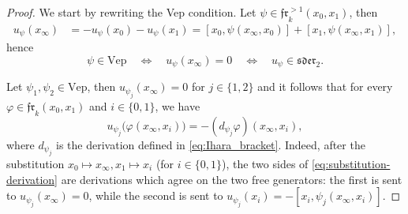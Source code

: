 \documentclass[a4paper,fleqn]{cas-sc}
\begin{document}
\begin{proof}
We start by rewriting the Vep condition. Let 
\(\psi\in\mathfrak{fr}^{>1}_k(x_0,x_1)\), then
\begin{align*}
u_\psi(x_\infty)
&=
-u_\psi(x_0)-u_\psi(x_1)=
[x_0,\psi(x_\infty,x_0)]
+[x_1,\psi(x_\infty,x_1)],
\end{align*}
hence
\[
\psi\in\mathrm{Vep}
\quad\Longleftrightarrow\quad
u_\psi(x_\infty)=0
\quad\Longleftrightarrow\quad
u_\psi\in\mathfrak{sder}_2.
\]

Let \(\psi_1,\psi_2\in \mathrm{Vep}\), then \(u_{\psi_j}(x_\infty)=0\)
for $j \in \{1,2\}$ and it follows that for 
every
\(\varphi\in\mathfrak{fr}_k(x_0,x_1)\) and
\(i\in\{0,1\}\), we have
\begin{equation}\label{eq:substitution-derivation}
u_{\psi_j}\bigl(\varphi(x_\infty,x_i)\bigr)
=
-(d_{\psi_j}\varphi)(x_\infty,x_i),
\end{equation}
where $d_{\psi_j}$ is the derivation defined in \eqref{eq:Ihara_bracket}.
Indeed, after the substitution $x_0 \mapsto x_\infty, x_1 \mapsto x_i$ (for $i\in \{0,1\}$), the two sides of
\eqref{eq:substitution-derivation} are derivations which agree on the two free
generators: the first is sent to
\(u_{\psi_j}(x_\infty)=0\), while the second is sent to
$u_{\psi_j}(x_i)
= -[x_i,\psi_j(x_\infty,x_i)].$


\end{proof}
\end{document}
